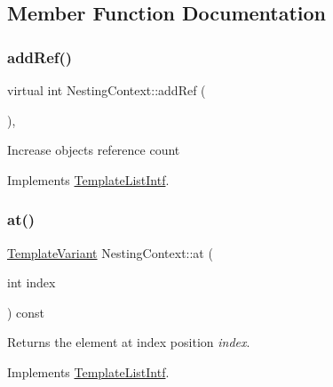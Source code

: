 \subsection{Member Function Documentation}
\mbox{\label{class_nesting_context_a71b0b342e5bb1b434a0390a77640df55}} 
\subsubsection{\texorpdfstring{addRef()}{addRef()}}
{\footnotesize\ttfamily virtual int Nesting\+Context\+::add\+Ref (\begin{DoxyParamCaption}{ }\end{DoxyParamCaption})\hspace{0.3cm}{\ttfamily [inline]}, {\ttfamily [virtual]}}

Increase object\textquotesingle{}s reference count 

Implements \mbox{\hyperlink{class_template_list_intf_a4b4973e2e15396d10bc4e3085462ca2b}{Template\+List\+Intf}}.

\mbox{\label{class_nesting_context_a11ff5ba22637b6ce76883c3cb840e67b}} 
\subsubsection{\texorpdfstring{at()}{at()}}
{\footnotesize\ttfamily \mbox{\hyperlink{class_template_variant}{Template\+Variant}} Nesting\+Context\+::at (\begin{DoxyParamCaption}\item[{int}]{index }\end{DoxyParamCaption}) const\hspace{0.3cm}{\ttfamily [virtual]}}

Returns the element at index position {\itshape index}. 

Implements \mbox{\hyperlink{class_template_list_intf_aa51e57e72eacf4e8ce1055ee30a0f7f8}{Template\+List\+Intf}}.

\mbox{\label{class_nesting_context_a71527fdcb3f4537999d866728480c1d4}} 
